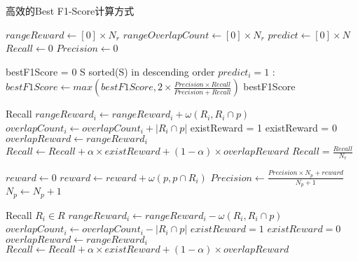   \begin{breakablealgorithm}
    \caption{高效的Best F1-Score计算方式}
    \begin{algorithmic}[1]
      \State $rangeReward \gets [0] \times N_r$
      \State $rangeOverlapCount \gets [0] \times N_r$
      \State $predict \gets [0] \times N$
      \State $Recall \gets 0$
      \State $Precision \gets 0$

      \State

      \State bestF1Score = 0
      \State S \gets sorted(S) in descending order
      \State $predict_i = 1$
          \State {}
          \State {}
      \EndIf
      :
          \State {}
          \State {}
      \EndIf
      \State {}
      \State $bestF1Score \gets max(bestF1Score, 2\times\frac{Precision \times Recall}{Precision + Recall})$
      \EndFor
      \State \Return bestF1Score
      \EndFunction
      
      \State

      \State Recall 
            \State $rangeReward_i \gets rangeReward_i + \omega(R_i,R_i \cap p)$
            \State $overlapCount_i \gets overlapCount_i +  |R_i\cap p|$
              \State existReward = 1
            \Else
              \State existReward = 0
            \EndIf
            \State $overlapReward \gets rangeReward_i$
            \State $Recall \gets Recall + \alpha \times existReward + (1-\alpha) \times overlapReward$
      \EndFor
      \State $Recall = \frac{Recall}{N_r}$

      \State

      \State $reward \gets 0$
            \State $reward \gets reward  + \omega(p, p \cap R_i)$
      \EndFor
      \State $Precision \gets \frac{Precision \times N_p + reward}{N_p + 1}$
      \State $N_p \gets N_p + 1$
      \EndFunction

      \State

      \State Recall 
      \ForAll $R_i \in R$
            \State $rangeReward_i \gets rangeReward_i - \omega(R_i,R_i \cap p)$
            \State $overlapCount_i \gets overlapCount_i - |R_i\cap p|$
              \State $existReward = 1$
            \Else
              \State $existReward = 0$
            \EndIf
            \State $overlapReward \gets rangeReward_i$
            \State $Recall \gets Recall +  \alpha \times existReward + (1-\alpha) \times overlapReward$
      \EndFor


\end{algorithmic}
\end{breakablealgorithm}
